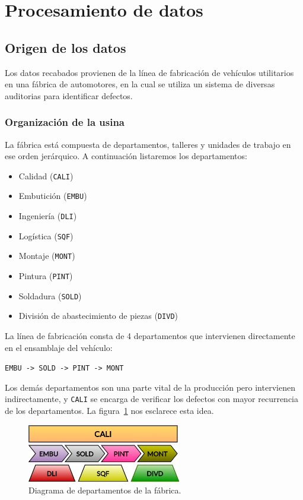 \documentclass[a4paper,12pt]{article}
\begin{document}
		\clearpage		
				
		\section{Procesamiento de datos}
				
		\subsection{Origen de los datos}
		Los datos recabados provienen de la línea de fabricación de vehículos utilitarios en una fábrica de automotores, en la cual se utiliza un sistema de diversas auditorias para identificar defectos.
				
		\subsubsection{Organización de la usina}
		La fábrica está compuesta de departamentos, talleres y unidades de trabajo en ese orden jerárquico. A continuación listaremos los departamentos:
				
		\begin{itemize}[noitemsep, topsep=2pt]
			\item Calidad (\texttt{CALI})
			\item Embutición (\texttt{EMBU})
			\item Ingeniería (\texttt{DLI})
			\item Logística (\texttt{SQF})
			\item Montaje (\texttt{MONT})
			\item Pintura (\texttt{PINT})
			\item Soldadura (\texttt{SOLD})
			\item División de abastecimiento de piezas (\texttt{DIVD})
		\end{itemize}
				
		La línea de fabricación consta de 4 departamentos que intervienen directamente en el ensamblaje del vehículo:
				
		\texttt{EMBU -> SOLD -> PINT -> MONT}
				
		Los demás departamentos son una parte vital de la producción pero intervienen indirectamente, y \texttt{CALI} se encarga de verificar los defectos con mayor recurrencia de los departamentos. La figura~\ref{fig:dptodiagram} nos esclarece esta idea.
				
		\begin{figure}[H]
			\begin{center}				
				\includegraphics[width=0.6\textwidth]{usina.png}
				\caption{Diagrama de departamentos de la fábrica.}
				\label{fig:dptodiagram}
			\end{center}
		\end{figure}
				
\end{document}
